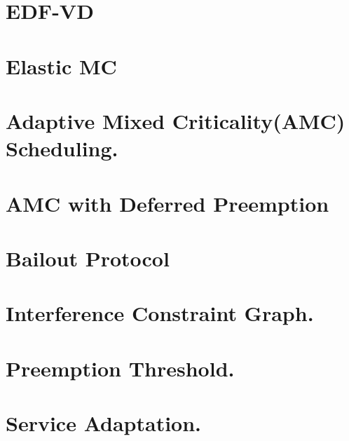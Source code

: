 \section{EDF-VD}

\newpage
\section{Elastic MC}

\newpage
\section{Adaptive Mixed Criticality(AMC) Scheduling.}

\newpage
\section{AMC with Deferred Preemption}

\newpage
\section{Bailout Protocol}

\newpage
\section{Interference Constraint Graph.}

\newpage
\section{Preemption Threshold.}

\newpage
\section{Service Adaptation.}


